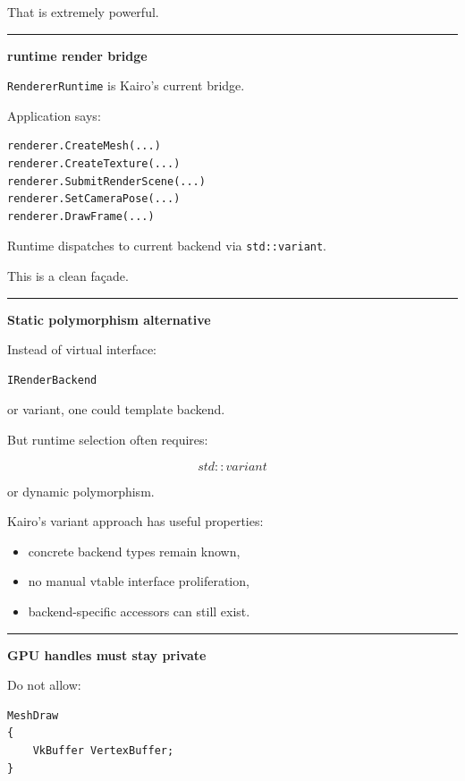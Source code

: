That is extremely powerful.

\begin{center}\rule{0.5\linewidth}{0.5pt}\end{center}

\textbf{runtime render bridge}

\texttt{RendererRuntime} is Kairo's current bridge.

Application says:

\begin{verbatim}
renderer.CreateMesh(...)
renderer.CreateTexture(...)
renderer.SubmitRenderScene(...)
renderer.SetCameraPose(...)
renderer.DrawFrame(...)
\end{verbatim}

Runtime dispatches to current backend via \texttt{std::variant}.

This is a clean façade.

\begin{center}\rule{0.5\linewidth}{0.5pt}\end{center}

\textbf{Static polymorphism alternative}

Instead of virtual interface:

\begin{verbatim}
IRenderBackend
\end{verbatim}

or variant, one could template backend.

But runtime selection often requires:

\[
std::variant
\]

or dynamic polymorphism.

Kairo's variant approach has useful properties:

\begin{itemize}
\tightlist
\item
  concrete backend types remain known,
\item
  no manual vtable interface proliferation,
\item
  backend-specific accessors can still exist.
\end{itemize}

\begin{center}\rule{0.5\linewidth}{0.5pt}\end{center}

\textbf{GPU handles must stay private}

Do not allow:

\begin{verbatim}
MeshDraw
{
    VkBuffer VertexBuffer;
}
\end{verbatim}

